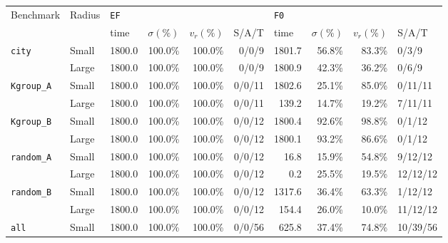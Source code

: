 \documentclass[review]{elsarticle}
\theoremstyle{definition}
\begin{document}
\begin{table}[]
\centering

\begin{tabular}{|l|l|*{4}{r}|*{4}{r}}
\hline
\multirow{2}{*}{Benchmark} & \multirow{2}{*}{Radius} & \multicolumn{4}{l|}{\texttt{EF}}                                                                                 	& \multicolumn{4}{l|}{\texttt{F0}}                                                                                                    	\\ \cline{3-10}
                       	& & \multicolumn{1}{l|}{time} & \multicolumn{1}{l|}{$\sigma(\%)$} & \multicolumn{1}{l|}{$v_r(\%)$} & \multicolumn{1}{l|}{S/A/T} & \multicolumn{1}{l|}{time} & \multicolumn{1}{l|}{$\sigma(\%)$} & \multicolumn{1}{l|}{$v_r(\%)$} & \multicolumn{1}{l|}{S/A/T}  \\ \hline
	\multirow{2}{*}{\texttt{city}}&Small & 1800.0 & 100.0\% & 100.0\% & 0/0/9 & 1801.7 & 56.8\% & 83.3\% & \multicolumn{1}{l|}{0/3/9} \\
&Large & 1800.0 & 100.0\% & 100.0\% & 0/0/9 & 1800.9 & 42.3\% & 36.2\% & \multicolumn{1}{l|}{0/6/9} \\ \cline{1-1}
\multirow{2}{*}{\texttt{Kgroup\_A}}&Small & 1800.0 & 100.0\% & 100.0\% & 0/0/11 & 1802.6 & 25.1\% & 85.0\% & \multicolumn{1}{l|}{0/11/11} \\
&Large & 1800.0 & 100.0\% & 100.0\% & 0/0/11 & 139.2 & 14.7\% & 19.2\% & \multicolumn{1}{l|}{7/11/11} \\ \cline{1-1}
\multirow{2}{*}{\texttt{Kgroup\_B}}&Small & 1800.0 & 100.0\% & 100.0\% & 0/0/12 & 1800.4 & 92.6\% & 98.8\% & \multicolumn{1}{l|}{0/1/12} \\
&Large & 1800.0 & 100.0\% & 100.0\% & 0/0/12 & 1800.1 & 93.2\% & 86.6\% & \multicolumn{1}{l|}{0/1/12} \\ \cline{1-1}
\multirow{2}{*}{\texttt{random\_A}}&Small & 1800.0 & 100.0\% & 100.0\% & 0/0/12 & 16.8 & 15.9\% & 54.8\% & \multicolumn{1}{l|}{9/12/12} \\
&Large & 1800.0 & 100.0\% & 100.0\% & 0/0/12 & 0.2 & 25.5\% & 19.5\% & \multicolumn{1}{l|}{12/12/12} \\ \cline{1-1}
\multirow{2}{*}{\texttt{random\_B}}&Small & 1800.0 & 100.0\% & 100.0\% & 0/0/12 & 1317.6 & 36.4\% & 63.3\% & \multicolumn{1}{l|}{1/12/12} \\
&Large & 1800.0 & 100.0\% & 100.0\% & 0/0/12 & 154.4 & 26.0\% & 10.0\% & \multicolumn{1}{l|}{11/12/12} \\ \cline{1-10}
\multirow{2}{*}{\texttt{all}}&Small & 1800.0 & 100.0\% & 100.0\% & 0/0/56 & 625.8 & 37.4\% & 74.8\% & \multicolumn{1}{l|}{10/39/56} \\

\end{tabular}
\end{table}
\end{document}
